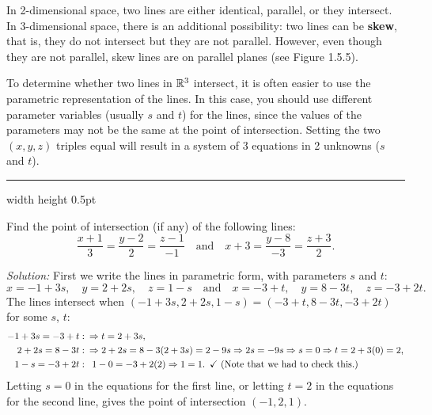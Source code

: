 \piccaption[]{}
In 2-dimensional space, two lines are either identical, parallel, or they intersect. In 3-dimensional space, there is an
additional possibility: two lines can be \textbf{skew}, that is, they do not intersect but they are not
parallel. 
However, even though they are not parallel, skew lines are on parallel planes (see Figure 1.5.5).

To determine
whether two lines in $\mathbb{R}^{3}$ intersect, it is often easier to use the parametric representation of the lines. 
In this case, you should use different parameter variables (usually $s$ and $t$) for the lines, since the values of the
parameters may not be the same at the point of intersection. 
Setting the two $(x,y,z)$ triples equal will result in a
system of 3 equations in 2 unknowns ($s$ and $t$).

\smallskip
\hrule width \textwidth height 0.5pt
\begin{exmp}
 Find the point of intersection (if any) of the following lines:
 \begin{displaymath}
  \frac{x + 1}{3} = \frac{y - 2}{2} = \frac{z - 1}{-1} \quad \text{and} \quad
  x + 3 = \frac{y - 8}{-3} = \frac{z + 3}{2}.
 \end{displaymath}
 \par\noindent\emph{Solution:} First we write the lines in parametric form, with parameters $s$ and $t$:
 \begin{displaymath}
  x = -1 + 3s,\quad y = 2 + 2s,\quad z = 1 - s \quad \text{and} \quad x = -3 + t,\quad y = 8 - 3t,\quad z = -3 + 2t.
 \end{displaymath}
 The lines intersect when $(-1 + 3s,2 + 2s,1 - s) = (-3 + t,8 - 3t,-3 + 2t)$ for some $s$, $t$:
 \begin{align*}
  -1 + 3s = -3 + t &: \enskip\Rightarrow t = 2 + 3s,\\
  2 + 2s = 8 - 3t &: \enskip\Rightarrow 2 + 2s = 8 - 3(2 + 3s) = 2 - 9s \Rightarrow 2s = -9s \Rightarrow s = 0
  \Rightarrow t = 2 + 3(0) = 2,\\
  1 - s = -3 + 2t &: \enskip1 - 0 = -3 + 2(2) \Rightarrow 1 = 1. \enskip\checkmark \text{~(Note that we had to check
  this.)}
 \end{align*}
 Letting $s = 0$ in the equations for the first line, or letting $t = 2$ in the equations for the second line,
 gives the point of intersection $(-1,2,1)$.
\end{exmp}


